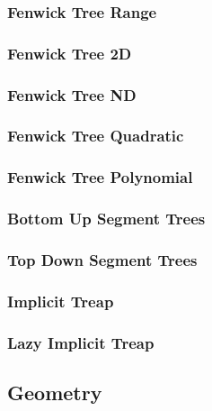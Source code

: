 \documentclass[8pt]{article}
\begin{document}
\subsubsection{Fenwick Tree Range}

\subsubsection{Fenwick Tree 2D}

\subsubsection{Fenwick Tree ND}

\subsubsection{Fenwick Tree Quadratic}

\subsubsection{Fenwick Tree Polynomial}

\subsubsection{Bottom Up Segment Trees}

\subsubsection{Top Down Segment Trees}

\subsubsection{Implicit Treap}

\subsubsection{Lazy Implicit Treap}



\subsection{Geometry}
\end{document}
